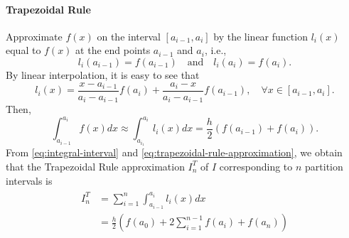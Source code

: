 \paragraph{Trapezoidal Rule}
Approximate $ f(x) $ on the interval $ [a_{i-1}, a_i] $ by the linear function
    $ l_i(x) $ equal to $ f(x) $ at the end points $ a_{i-1} $ and $ a_i $,
    i.e.,
\begin{equation*}
    l_i(a_{i-1}) = f(a_{i-1}) \quad \text{and} \quad l_i(a_i) = f(a_i).
\end{equation*}
By linear interpolation, it is easy to see that
\begin{equation}
    l_i(x) = \frac{x - a_{i-1}}{a_i - a_{i-1}} f(a_i) +
        \frac{a_i - x}{a_i - a_{i-1}} f(a_{i-1}), \quad
        \forall x \in [a_{i-1}, a_i].
    \label{eq:trapezoidal-linear-function}
\end{equation}
Then,
\begin{equation}
    \int_{a_{i-1}}^{a_i} f(x) dx \approx \int_{a_{i_1}}^{a_i} l_i(x) dx =
        \frac{h}{2} (f(a_{i-1}) + f(a_i)).
    \label{eq:trapezoidal-rule-approximation}
\end{equation}
From \eqref{eq:integral-interval} and \eqref{eq:trapezoidal-rule-approximation},
    we obtain that the Trapezoidal Rule approximation $ I_n^T $ of $ I $
    corresponding to $ n $ partition intervals is
\begin{align}
    \begin{split}
        I_n^T
            &= \sum_{i=1}^{n} \int_{a_{i-1}}^{a_i} l_i(x) dx \\
            &= \frac{h}{2} \left( f(a_0) + 2 \sum_{i=1}^{n-1} f(a_i) +
                f(a_n) \right)
        \label{eq:trapezoidal-rule-sum}
    \end{split}
\end{align}

